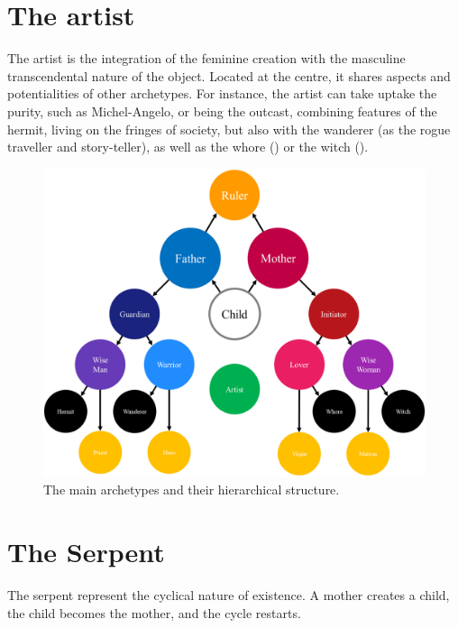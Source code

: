 \documentclass[
]{book}
\begin{document}
\hypertarget{the-artist}{%
\section{The artist}\label{the-artist}}

The artist is the integration of the feminine creation with the masculine transcendental nature of the object. Located at the centre, it shares aspects and potentialities of other archetypes. For instance, the artist can take uptake the purity, such as Michel-Angelo, or being the outcast, combining features of the hermit, living on the fringes of society, but also with the wanderer (as the rogue traveller and story-teller), as well as the whore () or the witch ().

\begin{figure}

{\centering \includegraphics[width=\textwidth]{img/archetypes} 

}

\caption{The main archetypes and their hierarchical structure.}\label{fig:unnamed-chunk-14}
\end{figure}

\hypertarget{the-serpent}{%
\section{The Serpent}\label{the-serpent}}

The serpent represent the cyclical nature of existence. A mother creates a child, the child becomes the mother, and the cycle restarts.
\end{document}
